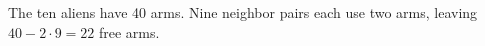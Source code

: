 The ten aliens have 40 arms. Nine neighbor pairs each use two arms, leaving $40-2\cdot9=\boxed{22}$ free arms.
